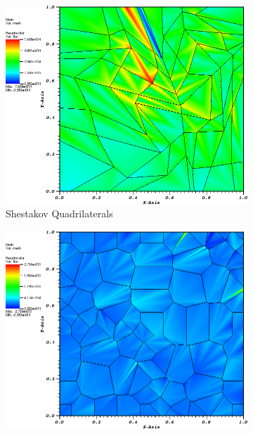 \begin{figure}
{\begin{subfigure}[b]{0.465\textwidth}
	\end{subfigure}
}
{
	\vspace{3mm}
	\begin{subfigure}[b]{0.465\textwidth}
		\centering
		\label{subfig::shes_quad_me_k2_lin_sol}
		\includegraphics[width=\textwidth]{figures/sec_BF/quad_err_shesquad_ME2.png}
		\caption{Shestakov Quadrilaterals}
	\end{subfigure}
	\hfill
	\begin{subfigure}[b]{0.465\textwidth}
		\centering
		\label{subfig::smooth_poly_me_k2_lin_sol}
		\includegraphics[width=\textwidth]{figures/sec_BF/quad_err_sinepoly_ME2.png}

\end{subfigure}}
\end{figure}
